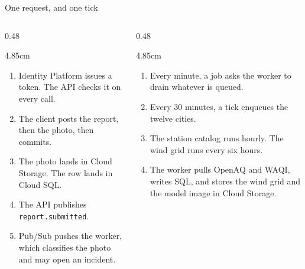 \documentclass[t,aspectratio=169]{beamer}
\begin{document}
\begin{frame}[c]{One request, and one tick}
  \begin{columns}[T,totalwidth=\textwidth]
    \begin{column}{0.48\textwidth}
      \begin{eqcard}{4.85cm}
        \begin{enumerate}
          \item Identity Platform issues a token. The API checks it on every call.
          \item The client posts the report, then the photo, then commits.
          \item The photo lands in Cloud Storage. The row lands in Cloud SQL.
          \item The API publishes \texttt{report.submitted}.
          \item Pub/Sub pushes the worker, which classifies the photo and may open an incident.
        \end{enumerate}
      \end{eqcard}
    \end{column}
    \hfill
    \begin{column}{0.48\textwidth}
      \begin{eqcard}{4.85cm}
        \begin{enumerate}
          \item Every minute, a job asks the worker to drain whatever is queued.
          \item Every 30 minutes, a tick enqueues the twelve cities.
          \item The station catalog runs hourly. The wind grid runs every six hours.
          \item The worker pulls OpenAQ and WAQI, writes SQL, and stores the wind grid and the model image in Cloud Storage.
        \end{enumerate}
      \end{eqcard}
    \end{column}
  \end{columns}
\end{frame}
\end{document}
